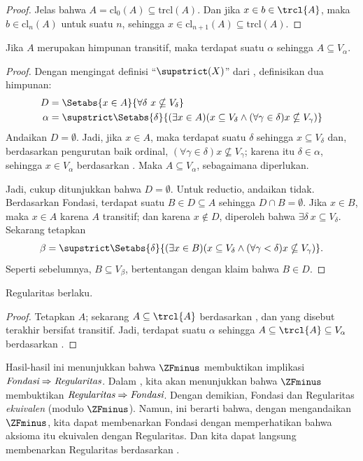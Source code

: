 \documentclass[../../../include/open-logic-section]{subfiles}
\begin{document}
\begin{proof}
Jelas bahwa $A = \text{cl}_0(A) \subseteq \text{trcl}(A)$. Dan jika
$x \in b \in \trcl{A}$, maka $b \in \text{cl}_n(A)$ untuk suatu $n$,
sehingga $x \in \text{cl}_{n+1}(A) \subseteq \text{trcl}(A)$.
\end{proof}

\begin{lem}
Jika $A$ merupakan himpunan transitif, maka terdapat suatu $\alpha$ sehingga
$A \subseteq V_\alpha$.
\end{lem}

\begin{proof}
Dengan mengingat definisi ``$\supstrict(X)$'' dari
, definisikan dua himpunan:
\begin{align*}
	D  &= \Setabs{x \in A}{\forall \delta\ x \nsubseteq V_\delta}\\
	\alpha &= \supstrict\Setabs{\delta}{(\exists x \in A)
	(x \subseteq V_\delta \land (\forall \gamma \in \delta)x \nsubseteq V_\gamma)}
\end{align*}
Andaikan $D = \emptyset$. Jadi, jika $x \in A$, maka terdapat suatu
$\delta$ sehingga $x \subseteq V_\delta$ dan, berdasarkan pengurutan baik
ordinal, $(\forall \gamma \in \delta)x \nsubseteq V_\gamma$; karena itu
$\delta \in \alpha$, sehingga $x \in V_\alpha$ berdasarkan
. Maka
$A \subseteq V_{\alpha}$, sebagaimana diperlukan.

Jadi, cukup ditunjukkan bahwa $D = \emptyset$. Untuk reductio, andaikan tidak.
Berdasarkan Fondasi, terdapat suatu $B \in D \subseteq A$ sehingga
$D \cap B = \emptyset$. Jika $x \in B$, maka $x \in A$ karena $A$
transitif; dan karena $x \notin D$, diperoleh bahwa
$\exists \delta\ x \subseteq V_\delta$. Sekarang tetapkan
\[
	\beta = \supstrict\Setabs{\delta}{(\exists x \in B)(x \subseteq V_\delta \land (\forall \gamma < \delta)x \nsubseteq V_\gamma)}.
\]
Seperti sebelumnya, $B \subseteq V_\beta$, bertentangan dengan klaim bahwa
$B \in D$.
\end{proof}

\begin{thm}
Regularitas berlaku.
\end{thm}

\begin{proof}
Tetapkan $A$; sekarang $A \subseteq \trcl{A}$ berdasarkan
, dan yang disebut terakhir bersifat transitif. Jadi,
terdapat suatu
$\alpha$ sehingga $A \subseteq \trcl{A} \subseteq V_\alpha$ berdasarkan
.
\end{proof}

Hasil-hasil ini menunjukkan bahwa $\ZFminus$ membuktikan implikasi
$\emph{Fondasi}\Rightarrow\emph{Regularitas}$. Dalam
, kita akan menunjukkan bahwa
$\ZFminus$ membuktikan
$\emph{Regularitas}\Rightarrow\emph{Fondasi}$. Dengan demikian, Fondasi dan
Regularitas \emph{ekuivalen} (modulo $\ZFminus$). Namun, ini berarti bahwa,
dengan mengandaikan $\ZFminus$, kita dapat membenarkan Fondasi dengan
memperhatikan bahwa aksioma itu ekuivalen dengan Regularitas. Dan kita dapat
langsung membenarkan Regularitas berdasarkan \stageshier{}.
\end{document}
